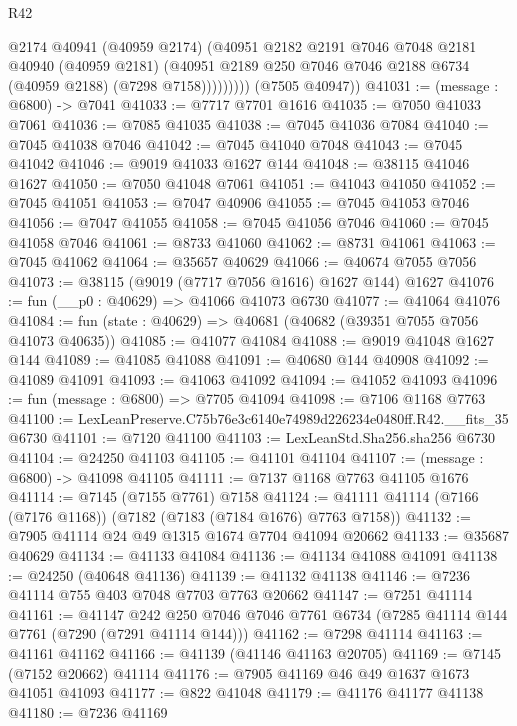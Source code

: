 \begin{lexlean}{R42}
\begin{coremodule}
{                  @2174
                  @40941
                  (@40959 @2174)
                  (@40951
                    @2182
                    @2191
                    @7046
                    @7048
                    @2181
                    @40940
                    (@40959 @2181)
                    (@40951 @2189 @250 @7046 @7046 @2188 @6734 (@40959 @2188) (@7298 @7158)))))))))
      (@7505 @40947))
@41031 := (message : @6800) -> @7041
@41033 := @7717 @7701 @1616
@41035 := @7050 @41033 @7061
@41036 := @7085 @41035
@41038 := @7045 @41036 @7084
@41040 := @7045 @41038 @7046
@41042 := @7045 @41040 @7048
@41043 := @7045 @41042
@41046 := @9019 @41033 @1627 @144
@41048 := @38115 @41046 @1627
@41050 := @7050 @41048 @7061
@41051 := @41043 @41050
@41052 := @7045 @41051
@41053 := @7047 @40906
@41055 := @7045 @41053 @7046
@41056 := @7047 @41055
@41058 := @7045 @41056 @7046
@41060 := @7045 @41058 @7046
@41061 := @8733 @41060
@41062 := @8731 @41061
@41063 := @7045 @41062
@41064 := @35657 @40629
@41066 := @40674 @7055 @7056
@41073 := @38115 (@9019 (@7717 @7056 @1616) @1627 @144) @1627
@41076 := fun (__p0 : @40629) => @41066 @41073 @6730
@41077 := @41064 @41076
@41084 := fun (state : @40629) => @40681 (@40682 (@39351 @7055 @7056 @41073 @40635))
@41085 := @41077 @41084
@41088 := @9019 @41048 @1627 @144
@41089 := @41085 @41088
@41091 := @40680 @144 @40908
@41092 := @41089 @41091
@41093 := @41063 @41092
@41094 := @41052 @41093
@41096 := fun (message : @6800) => @7705 @41094
@41098 := @7106 @1168 @7763
@41100 := LexLeanPreserve.C75b76e3c6140e74989d226234e0480ff.R42.__fits_35 @6730
@41101 := @7120 @41100
@41103 := LexLeanStd.Sha256.sha256 @6730
@41104 := @24250 @41103
@41105 := @41101 @41104
@41107 := (message : @6800) -> @41098 @41105
@41111 := @7137 @1168 @7763 @41105 @1676
@41114 := @7145 (@7155 @7761) @7158
@41124 := @41111 @41114 (@7166 (@7176 @1168)) (@7182 (@7183 (@7184 @1676) @7763 @7158))
@41132 := @7905 @41114 @24 @49 @1315 @1674 @7704 @41094 @20662
@41133 := @35687 @40629
@41134 := @41133 @41084
@41136 := @41134 @41088 @41091
@41138 := @24250 (@40648 @41136)
@41139 := @41132 @41138
@41146 := @7236 @41114 @755 @403 @7048 @7703 @7763 @20662
@41147 := @7251 @41114
@41161 := @41147
    @242
    @250
    @7046
    @7046
    @7761
    @6734
    (@7285 @41114 @144 @7761 (@7290 (@7291 @41114 @144)))
@41162 := @7298 @41114
@41163 := @41161 @41162
@41166 := @41139 (@41146 @41163 @20705)
@41169 := @7145 (@7152 @20662) @41114
@41176 := @7905 @41169 @46 @49 @1637 @1673 @41051 @41093
@41177 := @822 @41048
@41179 := @41176 @41177 @41138
@41180 := @7236 @41169
}
\end{coremodule}
\end{lexlean}
